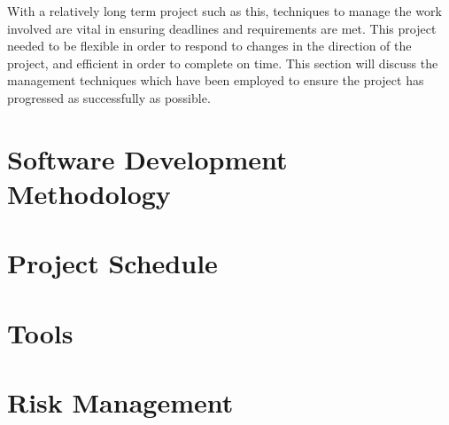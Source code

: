 % 

With a relatively long term project such as this, techniques to manage the work involved are vital in ensuring deadlines and requirements are met.
This project needed to be flexible in order to respond to changes in the direction of the project, and efficient in order to complete on time.
This section will discuss the management techniques which have been employed to ensure the project has progressed as successfully as possible.

\section{Software Development Methodology}
\label{software_development_methodology}


\section{Project Schedule}
\label{project_schedule}


\section{Tools}
\label{tools}


\section{Risk Management}
\label{risk_management}

